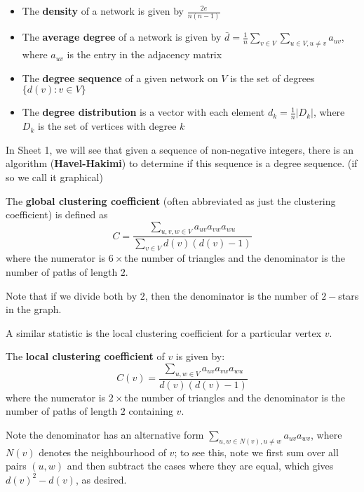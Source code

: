 \documentclass{article}
\begin{document}
\begin{itemize}
    \item  The \textbf{density} of a network is given by $\frac{2e}{n(n-1)}$
    \item The \textbf{average degree} of a network is given by $\bar{d}=\frac{1}{n}\sum_{v\in V} \sum_{u\in V, u\neq v} a_{uv}$, where $a_{uv}$ is the entry in the adjacency matrix
    \item The \textbf{degree sequence} of a given network on $V$ is the set of degrees $\{d(v): v\in V\}$
    \item The \textbf{degree distribution} is a vector with each element $d_k=\frac{1}{n} |D_k|$, where $D_k$ is the set of vertices with degree $k$
\end{itemize}
\begin{remark}
    In Sheet 1, we will see that given a sequence of non-negative integers, there is an algorithm (\textbf{Havel-Hakimi}) to determine if this sequence is a degree sequence. (if so we call it graphical)
\end{remark}

\begin{definition}
    The \textbf{global clustering coefficient} (often abbreviated as just the clustering coefficient) is defined as
    \begin{equation*}
        C = \frac{\sum_{u,v,w \in V} a_{uv}a_{vw}a_{wu}}{\sum_{v \in V} d(v)(d(v)-1)}
    \end{equation*}
    where the numerator is $6\times$the number of triangles and the denominator is the number of paths of length $2$.
\end{definition}

 Note that if we divide both by $2$, then the denominator is the number of $2-$stars in the graph.

A similar statistic is the local clustering coefficient for a particular vertex $v$.

\begin{definition}
    The \textbf{local clustering coefficient} of $v$ is given by:
    \begin{equation*}
        C(v) =  \frac{\sum_{u,w \in V} a_{uv}a_{vw}a_{wu}}{d(v)(d(v)-1)}
    \end{equation*}
    where the numerator is $2\times$the number of triangles and the denominator is the number of paths of length $2$ containing $v$.
\end{definition}
Note the denominator has an alternative form $\sum_{u, w \in N(v), u\neq w} a_{uv}a_{wv}$, where $N(v)$ denotes the neighbourhood of $v$; to see this, note we first sum over all pairs $(u,w)$ and then subtract the cases where they are equal, which gives $d(v)^2-d(v)$, as desired.
\end{document}
